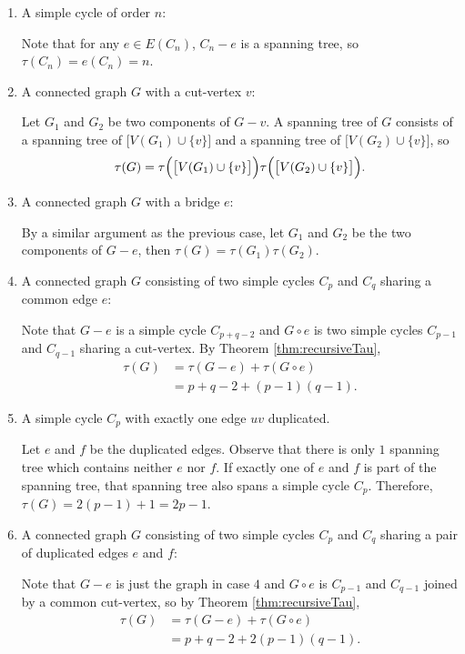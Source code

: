 \documentclass[math]{amznotes}
\theoremstyle{remark}
\begin{document}
\begin{enumerate}
    \item A simple cycle of order $n$:
    
    Note that for any $e \in E(C_n)$, $C_n - e$ is a spanning tree, so $\tau(C_n) = e(C_n) = n$.
    \item A connected graph $G$ with a cut-vertex $v$:
    
    Let $G_1$ and $G_2$ be two components of $G - v$. A spanning tree of $G$ consists of a spanning tree of $\bigl[V(G_1) \cup \{v\}\bigr]$ and a spanning tree of $\bigl[V(G_2) \cup \{v\}\bigr]$, so 
    \begin{equation*}
        \tau(G) = \tau\Bigl(\bigl[V(G_1) \cup \{v\}\bigr]\Bigr)\tau\Bigl(\bigl[V(G_2) \cup \{v\}\bigr]\Bigr).
    \end{equation*}
    \item A connected graph $G$ with a bridge $e$:
    
    By a similar argument as the previous case, let $G_1$ and $G_2$ be the two components of $G - e$, then $\tau(G) = \tau(G_1)\tau(G_2)$.
    \item A connected graph $G$ consisting of two simple cycles $C_p$ and $C_q$ sharing a common edge $e$:
    
    Note that $G - e$ is a simple cycle $C_{p + q - 2}$ and $G \circ e$ is two simple cycles $C_{p - 1}$ and $C_{q - 1}$ sharing a cut-vertex. By Theorem \ref{thm:recursiveTau},
    \begin{align*}
        \tau(G) & = \tau(G - e) + \tau(G \circ e) \\
        & = p + q - 2 + (p - 1)(q - 1).
    \end{align*}
    \item A simple cycle $C_p$ with exactly one edge $uv$ duplicated.
    
    Let $e$ and $f$ be the duplicated edges. Observe that there is only $1$ spanning tree which contains neither $e$ nor $f$. If exactly one of $e$ and $f$ is part of the spanning tree, that spanning tree also spans a simple cycle $C_p$. Therefore, $\tau(G) = 2(p - 1) + 1 = 2p - 1$. 
    \item A connected graph $G$ consisting of two simple cycles $C_p$ and $C_q$ sharing a pair of duplicated edges $e$ and $f$:
    
    Note that $G - e$ is just the graph in case $4$ and $G \circ e$ is $C_{p - 1}$ and $C_{q - 1}$ joined by a common cut-vertex, so by Theorem \ref{thm:recursiveTau},
    \begin{align*}
        \tau(G) & = \tau(G - e) + \tau(G \circ e) \\
        & = p + q - 2 + 2(p - 1)(q - 1).
    \end{align*}
\end{enumerate}
\end{document}
